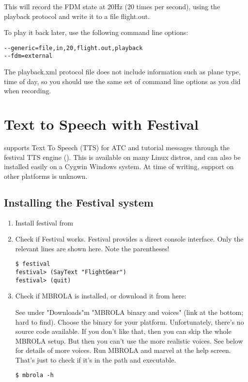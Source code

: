This will record the FDM state at 20Hz (20 times per second), using the playback
protocol and write it to a file flight.out.

To play it back later, use the following command line options:

\begin{verbatim}
--generic=file,in,20,flight.out,playback
--fdm=external
\end{verbatim}

The playback.xml protocol file does not include information such as plane type,
time of day, so you should use the same set of command line options as you
did when recording.

\section{Text to Speech with Festival}

\FlightGear{} supports Text To Speech (TTS) for ATC and tutorial messages through the festival TTS
engine (). This is available on many Linux distros,
and can also be installed easily on a Cygwin Windows system. At time of writing, support on other platforms is unknown.

\subsection{Installing the Festival system}

\begin{enumerate}
\item Install festival from 

\item Check if Festival works. Festival provides a direct console interface. Only the relevant lines are
shown here. Note the parentheses!

\begin{verbatim}
$ festival
festival> (SayText "FlightGear")
festival> (quit)
\end{verbatim}

\item Check if MBROLA is installed, or download it from here:


See under "Downloads"m "MBROLA binary and voices"
(link at the bottom; hard to find). Choose the binary for your platform. Unfortunately, there's no
source code available. If you don't like that, then you can skip the whole MBROLA setup.
But then you can't use the more realistic voices. See below for details of more voices.
Run MBROLA and marvel at the help screen. That's just to check if it's in the path and executable.

\begin{verbatim}
$ mbrola -h
\end{verbatim}
\end{enumerate}

